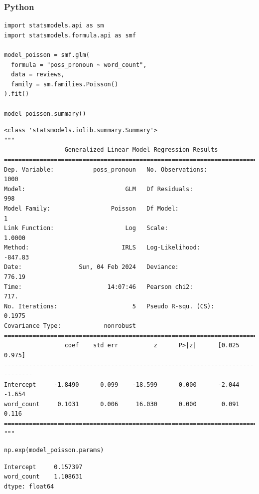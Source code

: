 \documentclass[
  letterpaper,
]{krantz}
\begin{document}
\subsubsection{Python}

\begin{verbatim}
import statsmodels.api as sm
import statsmodels.formula.api as smf

model_poisson = smf.glm(
  formula = "poss_pronoun ~ word_count",
  data = reviews,
  family = sm.families.Poisson()
).fit()

model_poisson.summary()        
\end{verbatim}

\begin{verbatim}
<class 'statsmodels.iolib.summary.Summary'>
"""
                 Generalized Linear Model Regression Results                  
==============================================================================
Dep. Variable:           poss_pronoun   No. Observations:                 1000
Model:                            GLM   Df Residuals:                      998
Model Family:                 Poisson   Df Model:                            1
Link Function:                    Log   Scale:                          1.0000
Method:                          IRLS   Log-Likelihood:                -847.83
Date:                Sun, 04 Feb 2024   Deviance:                       776.19
Time:                        14:07:46   Pearson chi2:                     717.
No. Iterations:                     5   Pseudo R-squ. (CS):             0.1975
Covariance Type:            nonrobust                                         
==============================================================================
                 coef    std err          z      P>|z|      [0.025      0.975]
------------------------------------------------------------------------------
Intercept     -1.8490      0.099    -18.599      0.000      -2.044      -1.654
word_count     0.1031      0.006     16.030      0.000       0.091       0.116
==============================================================================
"""
\end{verbatim}

\begin{verbatim}
np.exp(model_poisson.params)
\end{verbatim}

\begin{verbatim}
Intercept     0.157397
word_count    1.108631
dtype: float64
\end{verbatim}
\end{document}
